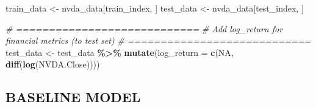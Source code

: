 \documentclass[
]{article}
\newenvironment{Shaded}{\begin{snugshade}}{\end{snugshade}}
\newcommand{\AttributeTok}[1]{\textcolor[rgb]{0.13,0.29,0.53}{#1}}
\newcommand{\CommentTok}[1]{\textcolor[rgb]{0.56,0.35,0.01}{\textit{#1}}}
\newcommand{\ConstantTok}[1]{\textcolor[rgb]{0.56,0.35,0.01}{#1}}
\newcommand{\FunctionTok}[1]{\textcolor[rgb]{0.13,0.29,0.53}{\textbf{#1}}}
\newcommand{\NormalTok}[1]{#1}
\newcommand{\OtherTok}[1]{\textcolor[rgb]{0.56,0.35,0.01}{#1}}
\newcommand{\SpecialCharTok}[1]{\textcolor[rgb]{0.81,0.36,0.00}{\textbf{#1}}}
\begin{document}
\begin{Shaded}
\begin{Highlighting}[]
\NormalTok{train\_data }\OtherTok{\textless{}{-}}\NormalTok{ nvda\_data[train\_index, ]}
\NormalTok{test\_data  }\OtherTok{\textless{}{-}}\NormalTok{ nvda\_data[test\_index, ]}

\CommentTok{\# ============================}
\CommentTok{\#  Add log\_return for financial metrics (to test set)}
\CommentTok{\# ============================}
\NormalTok{test\_data }\OtherTok{\textless{}{-}}\NormalTok{ test\_data }\SpecialCharTok{\%\textgreater{}\%}
  \FunctionTok{mutate}\NormalTok{(}\AttributeTok{log\_return =} \FunctionTok{c}\NormalTok{(}\ConstantTok{NA}\NormalTok{, }\FunctionTok{diff}\NormalTok{(}\FunctionTok{log}\NormalTok{(NVDA.Close))))}
\end{Highlighting}
\end{Shaded}

\subsection{BASELINE MODEL}\label{baseline-model}
\end{document}

